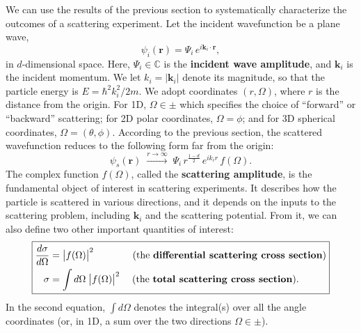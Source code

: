 \documentclass[pra,12pt]{revtex4}
\begin{document}
We can use the results of the previous section to systematically
characterize the outcomes of a scattering experiment.  Let the
incident wavefunction be a plane wave,
$$\psi_i(\mathbf{r}) = \Psi_i \, e^{i\mathbf{k}_i\cdot\mathbf{r}},$$
in $d$-dimensional space.  Here, $\Psi_i \in \mathbb{C}$ is the
\textbf{incident wave amplitude}, and $\mathbf{k}_i$ is the incident
momentum.  We let $k_i = |\mathbf{k}_i|$ denote its magnitude, so that
the particle energy is $E = \hbar^2k_i^2/2m$.  We adopt coordinates
$(r,\Omega)$, where $r$ is the distance from the origin.  For 1D,
$\Omega \in \pm$ which specifies the choice of ``forward'' or
``backward'' scattering; for 2D polar coordinates, $\Omega = \phi$;
and for 3D spherical coordinates, $\Omega = (\theta,\phi)$.  According
to the previous section, the scattered wavefunction reduces to the
following form far from the origin:
$$\psi_s(\mathbf{r})\;  \overset{r\rightarrow\infty}{\longrightarrow}\; \Psi_i \, r^{\frac{1-d}{2}} \, e^{ik_ir} \, f(\Omega).$$
The complex function $f(\Omega)$, called the \textbf{scattering
  amplitude}, is the fundamental object of interest in scattering
experiments.  It describes how the particle is scattered in various
directions, and it depends on the inputs to the scattering problem,
including $\mathbf{k}_i$ and the scattering potential.  From it, we
can also define two other important quantities of interest:
$$\boxed{\begin{aligned}\frac{d\sigma}{d\Omega} &= \big|f(\Omega)\big|^2 \qquad\quad\quad \text{(the \textbf{differential scattering cross section})} \\ \sigma &= \int d\Omega\; \big|f(\Omega)\big|^2 \quad\; \text{(the \textbf{total scattering cross section}).}
  \end{aligned}}$$
In the second equation, $\int d\Omega$ denotes the integral(s) over
all the angle coordinates (or, in 1D, a sum over the two directions
$\Omega \in \pm$).
\end{document}
